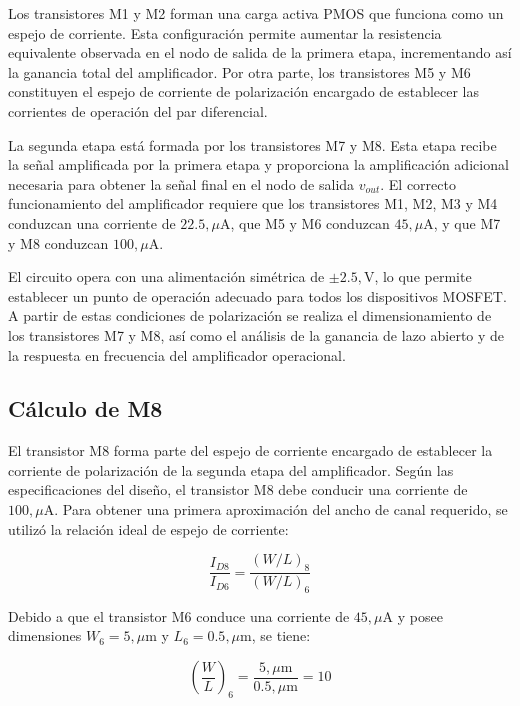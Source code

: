 \documentclass[journal]{IEEEtran}
\begin{document}
Los transistores M1 y M2 forman una carga activa PMOS que funciona como un espejo de corriente. Esta configuración permite aumentar la resistencia equivalente observada en el nodo de salida de la primera etapa, incrementando así la ganancia total del amplificador. Por otra parte, los transistores M5 y M6 constituyen el espejo de corriente de polarización encargado de establecer las corrientes de operación del par diferencial.

La segunda etapa está formada por los transistores M7 y M8. Esta etapa recibe la señal amplificada por la primera etapa y proporciona la amplificación adicional necesaria para obtener la señal final en el nodo de salida $v_{out}$. El correcto funcionamiento del amplificador requiere que los transistores M1, M2, M3 y M4 conduzcan una corriente de $22.5,\mu\text{A}$, que M5 y M6 conduzcan $45,\mu\text{A}$, y que M7 y M8 conduzcan $100,\mu\text{A}$.

El circuito opera con una alimentación simétrica de $\pm 2.5,\text{V}$, lo que permite establecer un punto de operación adecuado para todos los dispositivos MOSFET. A partir de estas condiciones de polarización se realiza el dimensionamiento de los transistores M7 y M8, así como el análisis de la ganancia de lazo abierto y de la respuesta en frecuencia del amplificador operacional.


\subsection{Cálculo de M8}


El transistor M8 forma parte del espejo de corriente encargado de establecer la corriente de polarización de la segunda etapa del amplificador. Según las especificaciones del diseño, el transistor M8 debe conducir una corriente de $100,\mu\text{A}$. Para obtener una primera aproximación del ancho de canal requerido, se utilizó la relación ideal de espejo de corriente:

\begin{equation}
\frac{I_{D8}}{I_{D6}} =
\frac{(W/L)_8}{(W/L)_6}
\end{equation}

Debido a que el transistor M6 conduce una corriente de $45,\mu\text{A}$ y posee dimensiones $W_6=5,\mu\text{m}$ y $L_6=0.5,\mu\text{m}$, se tiene:

\begin{equation}
\left(\frac{W}{L}\right)_6 =
\frac{5,\mu\text{m}}{0.5,\mu\text{m}} = 10
\end{equation}
\end{document}
